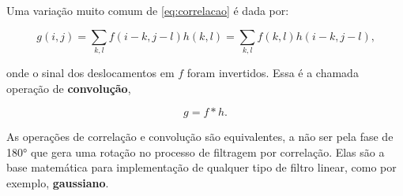 Uma variação muito comum de \eqref{eq:correlacao} é dada por:

\begin{equation}
  \label{eq:convolucao}
  g(i,j)=\sum_{k,l}f(i-k,j-l)h(k,l)=\sum_{k,l}f(k,l)h(i-k,j-l)\text{,}
\end{equation}

\noindent onde o sinal dos deslocamentos em $f$ foram invertidos. Essa é a chamada operação de \textbf{convolução},

\begin{equation}
  \label{eq:convolucao_compac}
  g=f*h\text{.}
\end{equation}

As operações de correlação e convolução são equivalentes, a não ser pela fase de 180° que gera uma rotação no processo de filtragem por correlação. Elas são a base matemática para implementação de qualquer tipo de filtro linear, como por exemplo, \textbf{gaussiano}.

